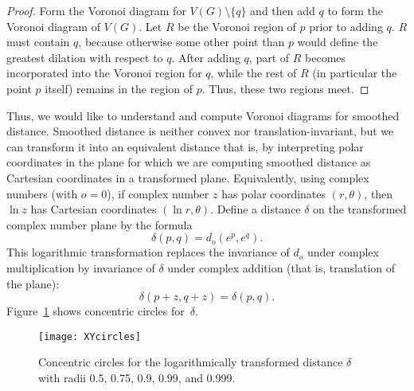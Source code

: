 \documentclass[10pt, conference, compsocconf]{IEEEtran}
\begin{document}
\begin{proof}
Form the Voronoi diagram for $V(G)\setminus\{q\}$ and then add $q$ to form the Voronoi diagram of $V(G)$. Let $R$ be the Voronoi region of $p$ prior to adding $q$.
$R$ must contain $q$, because otherwise some other point than $p$ would define the greatest dilation with respect to $q$. After adding $q$, part of $R$ becomes incorporated into the Voronoi region for $q$, while the rest of $R$ (in particular the point $p$ itself) remains in the region of $p$. Thus, these two regions meet.
\end{proof}

Thus, we would like to understand and compute Voronoi diagrams for smoothed distance. Smoothed distance is neither convex nor translation-invariant, but we can transform it into an equivalent distance that is, by interpreting polar coordinates in the plane for which we are computing smoothed distance as Cartesian coordinates in a transformed plane. Equivalently, using complex numbers (with $o=0$), if complex number $z$ has polar coordinates $(r,\theta)$, then $\ln z$ has Cartesian coordinates $(\ln r,\theta)$. Define a distance $\delta$ on the transformed complex number plane by the formula
$$\delta(p,q)=d_o(e^p,e^q).$$
This logarithmic transformation replaces the invariance of $d_o$ under complex multiplication by invariance of $\delta$ under complex addition (that is, translation of the plane):
$$\delta(p+z,q+z)=\delta(p,q).$$
Figure~\ref{fig:XYcircles} shows concentric circles for~$\delta$.

\begin{figure}[t]
\centering\texttt{[image: XYcircles]}
\caption{Concentric circles for the logarithmically transformed distance $\delta$ with radii 0.5, 0.75, 0.9, 0.99, and 0.999.}
\label{fig:XYcircles}
\end{figure}
\end{document}
